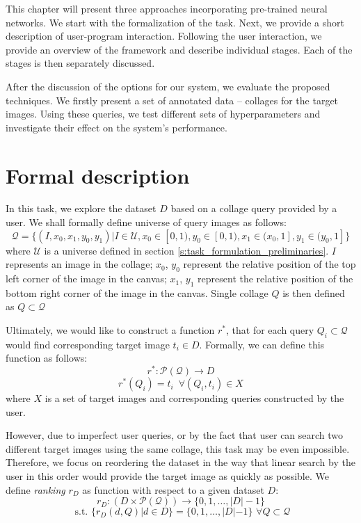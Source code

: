 This chapter will present three approaches incorporating pre-trained neural networks. We start with the formalization of the task. Next, we provide a short description of user-program interaction. Following the user interaction, we provide an overview of the framework and describe individual stages. Each of the stages is then separately discussed. 

After the discussion of the options for our system, we evaluate the proposed techniques. We firstly present a set of annotated data -- collages for the target images. Using these queries, we test different sets of hyperparameters and investigate their effect on the system's performance. 

\section{Formal description}

In this task, we explore the dataset $D$ based on a collage query provided by a user. We shall formally define universe of query images as follows: 
$$
    \mathcal{Q} = \{(I, x_0, x_1, y_0, y_1) | I \in \mathcal{U}, x_0 \in [0,1), y_0 \in [0, 1), x_1 \in (x_0, 1], y_1 \in (y_0, 1] \}
$$
where $\mathcal{U}$ is a universe defined in section \ref{s:task_formulation_preliminaries}. $I$ represents an image in the collage; $x_0$, $y_0$ represent the relative position of the top left corner of the image in the canvas; $x_1$, $y_1$ represent the relative position of the bottom right corner of the image in the canvas. Single collage $Q$ is then defined as $Q \subset \mathcal{Q}$

Ultimately, we would like to construct a function $r^*$, that for each query $Q_i \subset \mathcal{Q}$ would find corresponding target image $t_i \in D$. Formally, we can define this function as follows:
$$
    r^*: \mathcal{P(Q)} \rightarrow D 
$$
$$
    r^*(Q_i) = t_i \,\,\, \forall (Q_i, t_i) \in X
$$
where $X$ is a set of target images and corresponding queries constructed by the user.

However, due to imperfect user queries, or by the fact that user can search two different target images using the same collage, this task may be even impossible. Therefore, we focus on reordering the dataset in the way that linear search by the user in this order would provide the target image as quickly as possible. We define \emph{ranking} $r_{D}$ as function with respect to a given dataset $D$:
$$
    r_D: (D \times \mathcal{P(Q)}) \rightarrow \{0, 1, \ldots, |D|-1  \}
$$
$$
    \text{ s.t. } \{r_D(d, Q) | d \in D \} = \{0, 1, \ldots, |D|-1  \} \,\, \forall Q \subset \mathcal{Q}
$$


